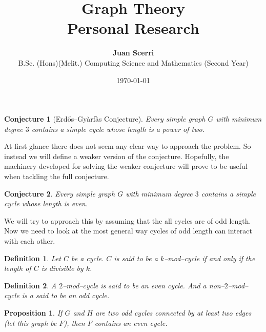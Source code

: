 \documentclass[12pt]{article}
\title{Graph Theory\\
\vspace{0.75em}\textbf{Personal Research}}
\date{\today}
\author {{\textbf{Juan Scerri}}\\
B.Sc. (Hons)(Melit.) Computing Science and Mathematics (Second Year)}
\theoremstyle{plain}
\newtheorem{prop}{Proposition}
\newtheorem{conj}{Conjecture}
\newtheorem{defn}{Definition}
\begin{document}
\maketitle %

\thispagestyle{empty} %

\begin{conj}[Erd\H os–Gy\` arf\` as Conjecture]

Every simple graph $G$ with minimum degree $3$ contains a simple
cycle whose length is a power of two.

\end{conj}

At first glance there does not seem any clear way to approach
the problem. So instead we will define a weaker version of the
conjecture. Hopefully, the machinery developed for solving the
weaker conjecture will prove to be useful when tackling the full
conjecture.

\begin{conj}

Every simple graph $G$ with minimum degree $3$ contains a simple
cycle whose length is even.

\end{conj}

We will try to approach this by assuming that the all cycles are
of odd length. Now we need to look at the most general way
cycles of odd length can interact with each other.

\begin{defn}
Let $C$ be a cycle. $C$ is said to be a $k$--mod--cycle if and
only if the length of $C$ is divisible by $k$.
\end{defn}

\begin{defn}
A $2$--mod--cycle is said to be an even cycle. And a
non--$2$--mod--cycle is a said to be an odd cycle. 
\end{defn}

\begin{prop}\label{edge-connected-cycles}
If $G$ and $H$ are two odd cycles connected by at least two
edges (let this graph be $F$), then $F$ contains an even cycle. 
\end{prop}
\end{document}
